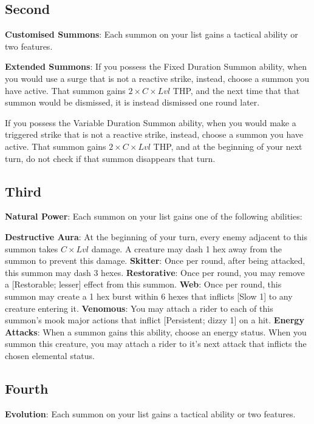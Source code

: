 \begin{multicols}{2}
\subsection*{Second \Facet}
\textbf{Customised Summons}: Each summon on your list gains a tactical ability or two features.

\textbf{Extended Summons}: If you possess the Fixed Duration Summon ability, when you would use a surge that is not a reactive strike, instead, choose a summon you have active. That summon gains $2\times C\times Lvl$ THP, and the next time that that summon would be dismissed, it is instead dismissed one round later.

If you possess the Variable Duration Summon ability, when you would make a triggered strike that is not a reactive strike, instead, choose a summon you have active. That summon gains $2\times C\times Lvl$ THP, and at the beginning of your next turn, do not check if that summon disappears that turn.

\subsection*{Third \Facet\perk}
\textbf{Natural Power}: Each summon on your list gains one of the following abilities:
\begin{itemize}
\thing \textbf{Destructive Aura}: At the beginning of your turn, every enemy adjacent to this summon takes $C\times Lvl$ damage. A creature may dash 1 hex away from the summon to prevent this damage.
\thing \textbf{Skitter}: Once per round, after being attacked, this summon may dash 3 hexes.
\thing \textbf{Restorative}: Once per round, you may remove a [Restorable; lesser] effect from this summon. 
\thing \textbf{Web}: Once per round, this summon may create a 1 hex burst within 6 hexes that inflicts [Slow 1] to any creature entering it.
\thing \textbf{Venomous}: You may attach a rider to each of this summon’s mook major actions that inflict [Persistent; dizzy 1] on a hit.
\thing \textbf{Energy Attacks}: When a summon gains this ability, choose an energy status. When you summon this creature, you may attach a rider to it’s next attack that inflicts the chosen elemental status.
\end{itemize}

\subsection*{Fourth \Facet}
\textbf{Evolution}: Each summon on your list gains a tactical ability or two features.


\end{multicols}
